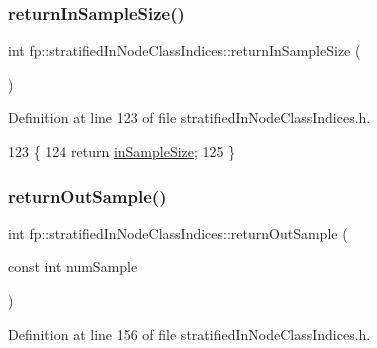 \subsubsection{\texorpdfstring{return\+In\+Sample\+Size()}{returnInSampleSize()}}
{\footnotesize\ttfamily int fp\+::stratified\+In\+Node\+Class\+Indices\+::return\+In\+Sample\+Size (\begin{DoxyParamCaption}{ }\end{DoxyParamCaption})\hspace{0.3cm}{\ttfamily [inline]}}



Definition at line 123 of file stratified\+In\+Node\+Class\+Indices.\+h.


\begin{DoxyCode}
123                                            \{
124                 \textcolor{keywordflow}{return} \hyperlink{classfp_1_1stratifiedInNodeClassIndices_a2acb617e3212806ae7f994d925bd1468}{inSampleSize};
125             \}
\end{DoxyCode}
\mbox{\label{classfp_1_1stratifiedInNodeClassIndices_aa872890a8499e449129796cf6bb9af04}} 
\subsubsection{\texorpdfstring{return\+Out\+Sample()}{returnOutSample()}}
{\footnotesize\ttfamily int fp\+::stratified\+In\+Node\+Class\+Indices\+::return\+Out\+Sample (\begin{DoxyParamCaption}\item[{const int}]{num\+Sample }\end{DoxyParamCaption})\hspace{0.3cm}{\ttfamily [inline]}}



Definition at line 156 of file stratified\+In\+Node\+Class\+Indices.\+h.


